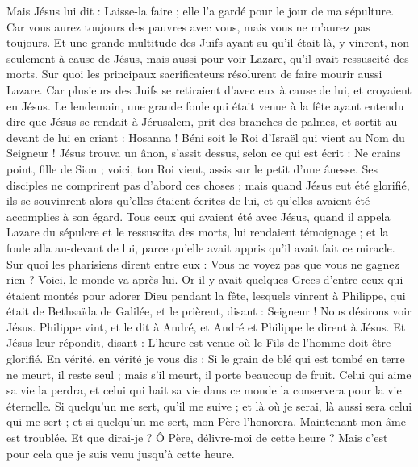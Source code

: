 \begin{multicols}{2}
Mais Jésus lui dit : Laisse-la faire ; elle l'a gardé pour le jour de ma sépulture.
Car vous aurez toujours des pauvres avec vous, mais vous ne m'aurez pas toujours.
Et une grande multitude des Juifs ayant su qu'il était là, y vinrent, non seulement à cause de Jésus, mais aussi pour voir Lazare, qu'il avait ressuscité des morts.
Sur quoi les principaux sacrificateurs résolurent de faire mourir aussi Lazare.
Car plusieurs des Juifs se retiraient d'avec eux à cause de lui, et croyaient en Jésus.
Le lendemain, une grande foule qui était venue à la fête ayant entendu dire que Jésus se rendait à Jérusalem,
prit des branches de palmes, et sortit au-devant de lui en criant : Hosanna ! Béni soit le Roi d'Israël qui vient au Nom du Seigneur !
Jésus trouva un ânon, s'assit dessus, selon ce qui est écrit :
Ne crains point, fille de Sion ; voici, ton Roi vient, assis sur le petit d'une ânesse.
Ses disciples ne comprirent pas d'abord ces choses ; mais quand Jésus eut été glorifié, ils se souvinrent alors qu'elles étaient écrites de lui, et qu'elles avaient été accomplies à son égard.
Tous ceux qui avaient été avec Jésus, quand il appela Lazare du sépulcre et le ressuscita des morts, lui rendaient témoignage ;
et la foule alla au-devant de lui, parce qu'elle avait appris qu'il avait fait ce miracle.
Sur quoi les pharisiens dirent entre eux : Vous ne voyez pas que vous ne gagnez rien ? Voici, le monde va après lui.
Or il y avait quelques Grecs d'entre ceux qui étaient montés pour adorer Dieu pendant la fête,
lesquels vinrent à Philippe, qui était de Bethsaïda de Galilée, et le prièrent, disant : Seigneur ! Nous désirons voir Jésus.
Philippe vint, et le dit à André, et André et Philippe le dirent à Jésus.
Et Jésus leur répondit, disant : L'heure est venue où le Fils de l'homme doit être glorifié.
En vérité, en vérité je vous dis : Si le grain de blé qui est tombé en terre ne meurt, il reste seul ; mais s'il meurt, il porte beaucoup de fruit.
Celui qui aime sa vie la perdra, et celui qui hait sa vie dans ce monde la conservera pour la vie éternelle.
Si quelqu'un me sert, qu'il me suive ; et là où je serai, là aussi sera celui qui me sert ; et si quelqu'un me sert, mon Père l'honorera.
Maintenant mon âme est troublée. Et que dirai-je ? Ô Père, délivre-moi de cette heure ? Mais c'est pour cela que je suis venu jusqu'à cette heure.

\end{multicols}
